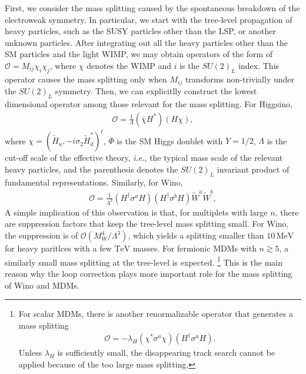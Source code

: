 \documentclass[12pt,twoside,book]{article}
\begin{document}
First, we consider the mass splitting caused by the spontaneous breakdown of the electroweak symmetry.
In particular, we start with the tree-level propagation of heavy particles, such as the SUSY particles other than the LSP, or another unknown particles.
After integrating out all the heavy particles other than the SM particles and the light WIMP, we may obtain operators of the form of $\mathcal{O} = M_{i j} \chi_i \chi_j$, where $\chi$ denotes the WIMP and $i$ is the $SU(2)_L$ index.
This operator causes the mass splitting only when $M_{i j}$ transforms non-trivially under the $SU(2)_L$ symmetry.
Then, we can explicitlly construct the lowest dimensional operator among those relevant for the mass splitting.
For Higgsino,
\begin{align}
  \mathcal{O} = \frac{1}{\Lambda} (\bar{\chi} H^{*}) (H \chi),
  \label{eq:Higgsino_mass_splitting}
\end{align}
where $\chi = (\tilde{H}_u, -i \sigma_2 \tilde{H}_d^{*})^t$, $\Phi$ is the SM Higgs doublet with $Y = 1/2$, $\Lambda$ is the cut-off scale of the effective theory, \textit{i.e.}, the typical mass scale of the relevant heavy particles, and the parenthesis denotes the $SU(2)_L$ invariant product of fundamental representations.
Similarly, for Wino, \cite{Gherghetta:1999sw}
\begin{align}
  \mathcal{O} = \frac{1}{\Lambda^3} (H^\dagger \sigma^a H) (H^\dagger \sigma^b H) \tilde{W}^a \tilde{W}^b,
  \label{eq:Wino_mass_splitting}
\end{align}
A simple implication of this observation is that, for multiplets with large $n$, there are suppression factors that keep the tree-level mass splitting small.
For Wino, the suppression is of $\mathcal{O} (M_W^4 / \Lambda^3)$, which yields a splitting smaller than $10\,\mathrm{MeV}$ for heavy paritlces with a few $\mathrm{TeV}$ masses.
For fermionic MDMs with $n \gtrsim 5$, a similarly small mass splitting at the tree-level is expected.
\footnote{
  For scalar MDMs, there is another renormalizable operator that generates a mass splitting
  \begin{align*}
    \mathcal{O} = - \lambda_H \left( \chi^{*} \sigma^a \chi \right) \left( H^\dagger \sigma^a H \right).
  \end{align*}
  Unless $\lambda_H$ is sufficiently small, the disappearing track search cannot be applied because of the too large mass splitting.
}
This is the main reason why the loop correction plays more important role for the mass splitting of Wino and MDMs.
\end{document}
